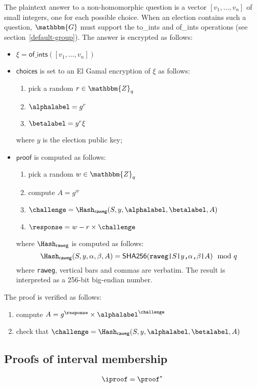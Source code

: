 \documentclass[a4paper]{article}
\newcommand{\G}{\mathbbm{G}}
\newcommand{\Z}{\mathbbm{Z}}
\newcommand{\shatwo}{\textsf{SHA256}}
\begin{document}
The plaintext answer to a non-homomorphic question is a vector
$[v_1,\dots,v_n]$ of small integers, one for each possible
choice. When an election contains such a question, $\G$ must support
the \textsf{to\_ints} and \textsf{of\_ints} operations (see
section~\ref{default-group}). The answer is encrypted as follows:
\begin{itemize}
\item $\xi=\textsf{of\_ints}([v_1,\dots,v_n])$
\item $\textsf{choices}$ is set to an El Gamal encryption of $\xi$ as
  follows:
  \begin{enumerate}
  \item pick a random $r\in\Z_q$
  \item $\alphalabel=g^r$
  \item $\betalabel=y^r\xi$
  \end{enumerate}
  where $y$ is the election public key;
\item $\textsf{proof}$ is computed as follows:
  \begin{enumerate}
  \item pick a random $w\in\Z_q$
  \item compute $A=g^w$
  \item $\challenge=\Hash_{\textsf{raweg}}(S,y,\alphalabel,\betalabel,A)$
  \item $\response=w-r\times\challenge$
  \end{enumerate}
  where $\Hash_{\textsf{raweg}}$ is computed as follows:
  \[
    \Hash_{\textsf{raweg}}(S,y,\alpha,\beta,A)=\shatwo(\verb=raweg|=S\verb=|=y\verb=,=\alpha\verb=,=\beta\verb=|=A)\mod q
  \]
  where \verb=raweg=, vertical bars and commas are verbatim. The
  result is interpreted as a 256-bit big-endian number.
\end{itemize}
The proof is verified as follows:
\begin{enumerate}
\item compute $A=g^\response\times\alphalabel^\challenge$
\item check that $\challenge=\Hash_{\textsf{raweg}}(S,y,\alphalabel,\betalabel,A)$
\end{enumerate}

\subsection{Proofs of interval membership}
\label{iproof}

\begin{gather*}
  \iproof=\proof^\ast
\end{gather*}
\end{document}
